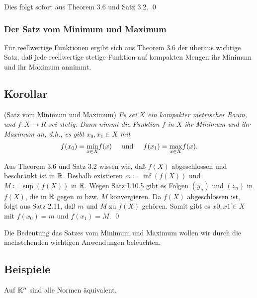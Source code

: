 \documentclass[a4paper,twoside]{book}
\begin{document}
\begin{Beweis} 
Dies folgt sofort aus Theorem 3.6 und Satz 3.2. \qed
\end{Beweis}\smallskip

\subsubsection{Der Satz vom Minimum und Maximum}

Für reellwertige Funktionen ergibt sich aus Theorem 3.6 der überaus wichtige Satz,
daß jede reellwertige stetige Funktion auf kompakten Mengen ihr Minimum und
ihr Maximum annimmt.

\subsection{Korollar} (Satz vom Minimum und Maximum) \textit{Es sei $X$ ein kompakter metrischer
Raum, und $f : X \rightarrow R$ sei stetig. Dann nimmt die Funktion $f$ in $X$ ihr
Minimum und ihr Maximum an, d.h., es gibt $x_0, x_1 \in X$ mit} \medskip
\begin{equation*}
  f(x_0) = \underset{x \in X}{\min} f(x) \hspace{5mm} \text{und} \hspace{5mm} f(x_1) = \underset{x \in X}{\max} f(x).
\end{equation*}
\medskip

\begin{Beweis} Aus Theorem 3.6 und Satz 3.2 wissen wir, daß $f(X)$ abgeschlossen und beschränkt ist in $\mathbb{R}$. 
Deshalb existieren $m \coloneqq \inf(f(X))$ und $M \coloneqq \sup(f(X))$ in $\mathbb{R}$.
Wegen Satz I.10.5 gibt es Folgen $(y_n)$ und $(z_n)$ in $f(X)$, die in $\mathbb{R}$ gegen $m$ bzw. $M$
konvergieren. Da $f(X)$ abgeschlossen ist, folgt aus Satz 2.11, daß $m$ und $M$ zu $f(X)$
gehören. Somit gibt es $x0, x1 \in X$ mit $f(x_0) = m$ und $f(x_1) = M$. \qed
\end{Beweis}

Die Bedeutung das Satzes vom Minimum und Maximum wollen wir durch
die nachstehenden wichtigen Anwendungen beleuchten.

\subsection{Beispiele}  Auf $\mathbb{K}^n$ sind alle Normen äquivalent.
\end{document}
